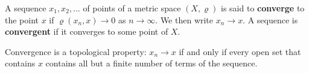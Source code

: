 A sequence $x_1, x_2, \ldots$ of points of a metric space $(X, \varrho)$ is said to \textbf{converge} to the point $x$ if $\varrho(x_n, x) \to 0$ as $n \to \infty$. We then write $x_n \to x$. A sequence is \textbf{convergent} if it converges to some point of $X$.

Convergence is a topological property: $x_n \to x$ if and only if every open set that contains $x$ contains all but a finite number of terms of the sequence.
